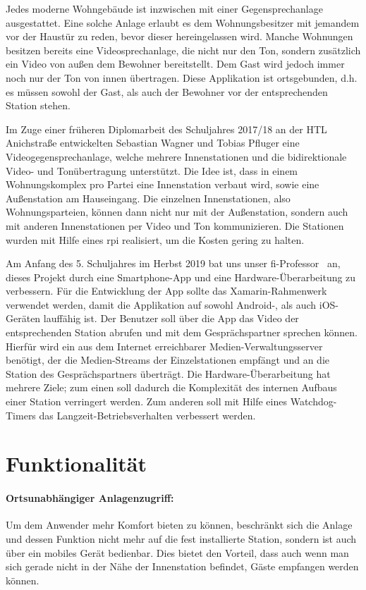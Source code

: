 Jedes moderne Wohngebäude ist inzwischen mit einer Gegensprechanlage ausgestattet.
Eine solche Anlage erlaubt es dem Wohnungsbesitzer mit jemandem vor der Haustür zu reden, bevor dieser hereingelassen wird.
Manche Wohnungen besitzen bereits eine Videosprechanlage, die nicht nur den Ton, sondern zusätzlich ein Video von außen dem Bewohner bereitstellt.
Dem Gast wird jedoch immer noch nur der Ton von innen übertragen.
Diese Applikation ist ortsgebunden, d.h. es müssen sowohl der Gast, als auch der Bewohner vor der entsprechenden Station stehen.\par

Im Zuge einer früheren Diplomarbeit des Schuljahres 2017/18 an der HTL Anichstraße entwickelten Sebastian Wagner und Tobias Pfluger eine Videogegensprechanlage, welche mehrere Innenstationen und die bidirektionale Video- und Tonübertragung unterstützt.
Die Idee ist, dass in einem Wohnungskomplex pro Partei eine Innenstation verbaut wird, sowie eine Außenstation am Hauseingang.
Die einzelnen Innenstationen, also Wohnungsparteien, können dann nicht nur mit der Außenstation, sondern auch mit anderen Innenstationen per Video und Ton kommunizieren.
Die Stationen wurden mit Hilfe eines \ac{rpi} realisiert, um die Kosten gering zu halten.\par

Am Anfang des 5. Schuljahres im Herbst 2019 bat uns unser \ac{fi}-Professor \MarioPrantl\ an, dieses Projekt durch eine Smartphone-App und eine Hardware-Überarbeitung zu verbessern.
Für die Entwicklung der App sollte das Xamarin-Rahmenwerk verwendet werden, damit die Applikation auf sowohl Android-, als auch iOS-Geräten lauffähig ist. 
Der Benutzer soll über die App das Video der entsprechenden Station abrufen und mit dem Gesprächspartner sprechen können.
Hierfür wird ein aus dem Internet erreichbarer Medien-Verwaltungsserver benötigt, der die Medien-Streams der Einzelstationen empfängt und an die Station des Gesprächspartners überträgt.
Die Hardware-Überarbeitung hat mehrere Ziele; zum einen soll dadurch die Komplexität des internen Aufbaus einer Station verringert werden.
Zum anderen soll mit Hilfe eines Watchdog-Timers das Langzeit-Betriebsverhalten verbessert werden.

\section{Funktionalität}
\paragraph{Ortsunabhängiger Anlagenzugriff:}
Um dem Anwender mehr Komfort bieten zu können, beschränkt sich die Anlage und dessen Funktion nicht mehr auf die fest installierte Station, sondern ist auch über ein mobiles Gerät bedienbar.
Dies bietet den Vorteil, dass auch wenn man sich gerade nicht in der Nähe der Innenstation befindet, Gäste empfangen werden können.

